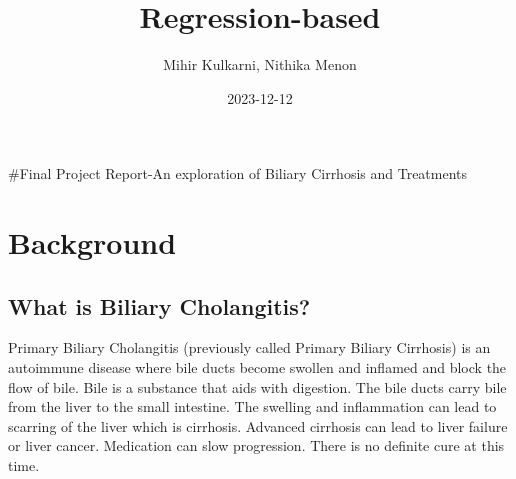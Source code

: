 \documentclass[
]{article}
\title{Regression-based}
\author{Mihir Kulkarni, Nithika Menon}
\date{2023-12-12}
\begin{document}
\maketitle

\#Final Project Report-An exploration of Biliary Cirrhosis and
Treatments

\hypertarget{background}{%
\section{Background}\label{background}}

\hypertarget{what-is-biliary-cholangitis}{%
\subsection{What is Biliary
Cholangitis?}\label{what-is-biliary-cholangitis}}

Primary Biliary Cholangitis (previously called Primary Biliary
Cirrhosis) is an autoimmune disease where bile ducts become swollen and
inflamed and block the flow of bile. Bile is a substance that aids with
digestion. The bile ducts carry bile from the liver to the small
intestine. The swelling and inflammation can lead to scarring of the
liver which is cirrhosis. Advanced cirrhosis can lead to liver failure
or liver cancer. Medication can slow progression. There is no definite
cure at this time.
\end{document}
